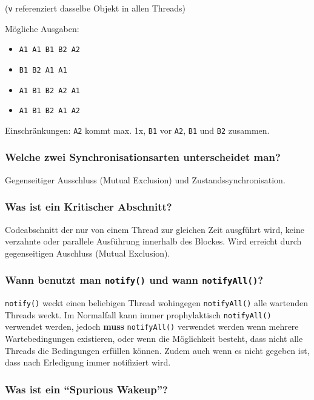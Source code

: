 \documentclass[10pt,a4paper]{scrartcl}
\begin{document}
(\texttt{v} referenziert dasselbe Objekt in allen Threads)

Mögliche Ausgaben:
\begin{itemize}
	\item \texttt{A1 A1 B1 B2 A2}
	\item \texttt{B1 B2 A1 A1}
	\item \texttt{A1 B1 B2 A2 A1}
	\item \texttt{A1 B1 B2 A1 A2}
\end{itemize}

Einschränkungen: \texttt{A2} kommt max. 1x, \texttt{B1} vor \texttt{A2}, \texttt{B1} und
\texttt{B2} zusammen.
  
\subsubsection{Welche zwei Synchronisationsarten unterscheidet man?}

Gegenseitiger Ausschluss (Mutual Exclusion) und Zustandssynchronisation.
  
\subsubsection{Was ist ein Kritischer Abschnitt?}

Codeabschnitt der nur von einem Thread zur gleichen Zeit ausgführt wird, keine verzahnte oder
parallele Ausführung innerhalb des Blockes. Wird erreicht durch gegenseitigen Auschluss (Mutual
Exclusion).
  
\subsubsection{Wann benutzt man \texttt{notify()} und wann \texttt{notifyAll()}?}

\begin{sloppypar}  %
\texttt{notify()} weckt einen beliebigen Thread wohingegen \texttt{notifyAll()} alle wartenden
Threads weckt. Im Normalfall kann immer prophylaktisch \texttt{notifyAll()} verwendet werden,
jedoch \textbf{muss} \texttt{notifyAll()} verwendet werden wenn mehrere Wartebedingungen
existieren, oder wenn die Möglichkeit besteht, dass nicht alle Threads die Bedingungen erfüllen
können. Zudem auch wenn es nicht gegeben ist, dass nach Erledigung immer notifiziert wird.
\end{sloppypar}
  
\subsubsection{Was ist ein "`Spurious Wakeup"'?}
\end{document}
